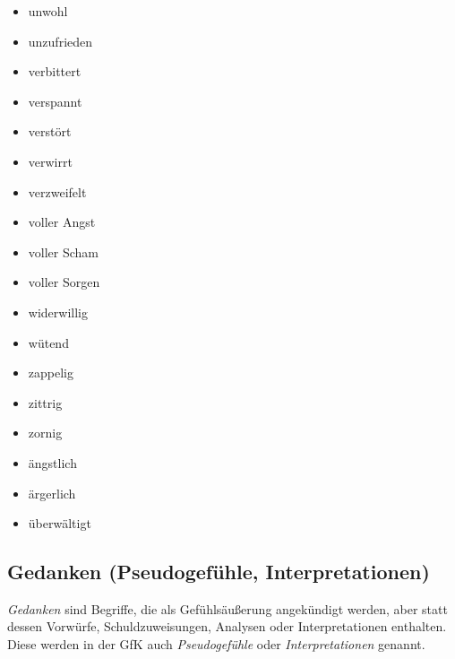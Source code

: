 \begin{multicols}{2}
\begin{itemize}
    \item unwohl
    \item unzufrieden
    \item verbittert
    \item verspannt
    \item verstört
    \item verwirrt
    \item verzweifelt
    \item voller Angst
    \item voller Scham
    \item voller Sorgen
    \item widerwillig
    \item wütend
    \item zappelig
    \item zittrig
    \item zornig
    \item ängstlich
    \item ärgerlich
    \item überwältigt
  \end{itemize}
\end{multicols}


\subsection{Gedanken (\glqq Pseudogefühle, Interpretationen\grqq)}
\label{pseudogefuehle}

\emph{Gedanken} sind Begriffe, die als Gefühlsäußerung angekündigt werden, aber statt dessen Vorwürfe, Schuldzuweisungen, Analysen oder Interpretationen enthalten. Diese werden in der GfK auch \emph{Pseudogefühle} oder \emph{Interpretationen} genannt.

